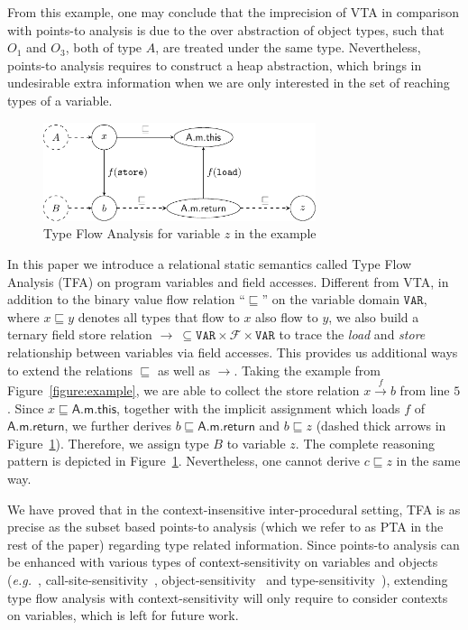 \documentclass{fac}
\newcommand\eg{\textit{e.g.\ }}
\newcommand\Var{\mathtt{VAR}}
\newcommand{\Field}{\mathcal{F}}
\newcommand{\less}{\sqsubseteq}
\newcommand{\hflow}{\longrightarrow}
\newcommand{\lhflow}[1]{\stackrel{#1}{\hflow}}
\begin{document}
From this example, one may conclude that the imprecision of VTA in comparison with points-to analysis is due to the over abstraction of object types, such that $O_1$ and $O_3$, both of type $A$, are treated under the same type. Nevertheless, points-to analysis requires to construct a heap abstraction, which brings in undesirable extra information when we are only interested in the set of reaching types of a variable.

\begin{figure}
\centering
\includegraphics[width=8cm]{tfa.pdf}
\caption{Type Flow Analysis for variable $z$ in the example}\label{fig:tfa}
\end{figure}

In this paper we introduce a relational static semantics called Type Flow Analysis (TFA) on program variables and field accesses. Different from VTA, in addition to the binary value flow relation ``$\less$'' on the variable domain $\Var$, where $x\less y$ denotes all types that flow to $x$ also flow to $y$, we also build a ternary field store relation $\rightarrow\ \subseteq\Var\times\Field\times\Var$ to trace the \emph{load} and \emph{store} relationship between variables via field accesses. This provides us additional ways to extend the relations $\less$ as well as $\rightarrow$. %
Taking the example from Figure~\ref{figure:example}, we are able to collect the store relation $x\lhflow{f}b$ from line $5$. Since $x\less \textsf{A.m.this}$, together with the implicit assignment which loads $f$ of $\textsf{A.m.return}$, we further derives $b\less\textsf{A.m.return}$ and $b\less z$ (dashed thick arrows in Figure~\ref{fig:tfa}). Therefore, we assign type $B$ to variable $z$. The complete reasoning pattern is depicted in Figure~\ref{fig:tfa}. Nevertheless, one cannot derive $c\less z$ in the same way.

We have proved that in the context-insensitive inter-procedural setting, TFA is as precise as the subset based points-to analysis (which we refer to as PTA in the rest of the paper) regarding type related information. Since points-to analysis can be enhanced with various types of context-sensitivity on variables and objects (\eg, call-site-sensitivity~\cite{Shivers91,Kastrinis2013}, object-sensitivity~\cite{Milanova2005,Smaragdakis11,Tan16} and type-sensitivity~\cite{Smaragdakis11}), extending type flow analysis with context-sensitivity will only require to consider contexts on variables, which is left for future work.
\end{document}
